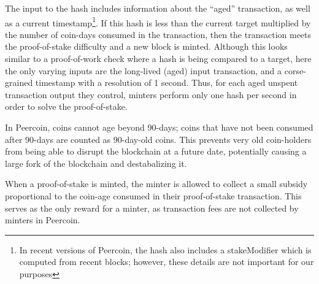 The input to the hash includes information about the ``aged'' transaction, as
well as a current timestamp\footnote{In recent versions of Peercoin, the hash
also includes a stakeModifier which is computed from recent blocks; however,
these details are not important for our purposes}. If this hash is less than the
current target multiplied by the number of coin-days consumed in the
transaction, then the transaction meets the proof-of-stake difficulty and a new
block is minted. Although this looks similar to a proof-of-work check where a
hash is being compared to a target, here the only varying inputs are the
long-lived (aged) input transaction, and a corse-grained timestamp with a
resolution of 1 second. Thus, for each aged unspent transaction output they
control, minters perform only one hash per second in order to solve the
proof-of-stake.

%



In Peercoin, coins cannot age beyond 90-days; coins that have not been consumed
after 90-days are counted as 90-day-old coins. This prevents very old
coin-holders from being able to disrupt the blockchain at a future date,
potentially causing a large fork of the blockchain and destabalizing it.

When a proof-of-stake is minted, the minter is allowed to collect a small
subsidy proportional to the coin-age consumed in their proof-of-stake
transaction. This serves as the only reward for a minter, as transaction fees are not
collected by minters in Peercoin.


